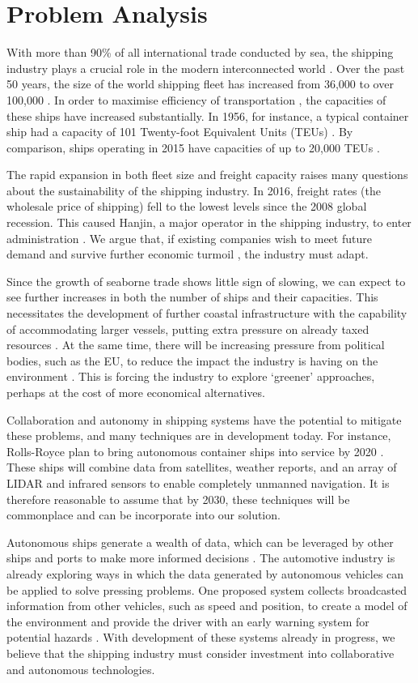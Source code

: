 \section{Problem Analysis}
With more than 90\% of all international trade conducted by sea, the shipping industry plays a crucial role in the modern interconnected world \cite{IMOfacts}. Over the past 50 years, the size of the world shipping fleet has increased from 36,000 to over 100,000 \cite{IMOfacts}. In order to maximise efficiency of transportation \cite{sizematters}, the capacities of these ships have increased substantially. In 1956, for instance, a typical container ship had a capacity of 101 Twenty-foot Equivalent Units (TEUs) \cite{ftarticle}. By comparison, ships operating in 2015 have capacities of up to 20,000 TEUs \cite{sizematters}.

The rapid expansion in both fleet size and freight capacity raises many questions about the sustainability of the shipping industry. In 2016, freight rates (the wholesale price of shipping) fell to the lowest levels since the 2008 global recession. This caused Hanjin, a major operator in the shipping industry, to enter administration \cite{globalCrisis}. We argue that, if existing companies wish to meet future demand and survive further economic turmoil \cite{5trends}, the industry must adapt. 

Since the growth of seaborne trade shows little sign of slowing, we can expect to see further increases in both the number of ships and their capacities. This necessitates the development of further coastal infrastructure with the capability of accommodating larger vessels, putting extra pressure on already taxed resources \cite{ftarticle}. At the same time, there will be increasing pressure from political bodies, such as the EU, to reduce the impact the industry is having on the environment \cite{eureport}. This is forcing the industry to explore `greener’ approaches, perhaps at the cost of more economical alternatives.

Collaboration and autonomy in shipping systems have the potential to mitigate these problems, and many techniques are in development today. For instance, Rolls-Royce plan to bring autonomous container ships into service by 2020 \cite{autoboats}. These ships will combine data from satellites, weather reports, and an array of LIDAR and infrared sensors to enable completely unmanned navigation. It is therefore reasonable to assume that by 2030, these techniques will be commonplace and can be incorporate into our solution.  

Autonomous ships generate a wealth of data, which can be leveraged by other ships and ports to make more informed decisions \cite{5trends}. The automotive industry is already exploring ways in which the data generated by autonomous vehicles can be applied to solve pressing problems. One proposed system collects broadcasted information from other vehicles, such as speed and position, to create a model of the environment and provide the driver with an early warning system for potential hazards \cite{c2c}. With development of these systems already in progress, we believe that the shipping industry must consider investment into collaborative and autonomous technologies.
